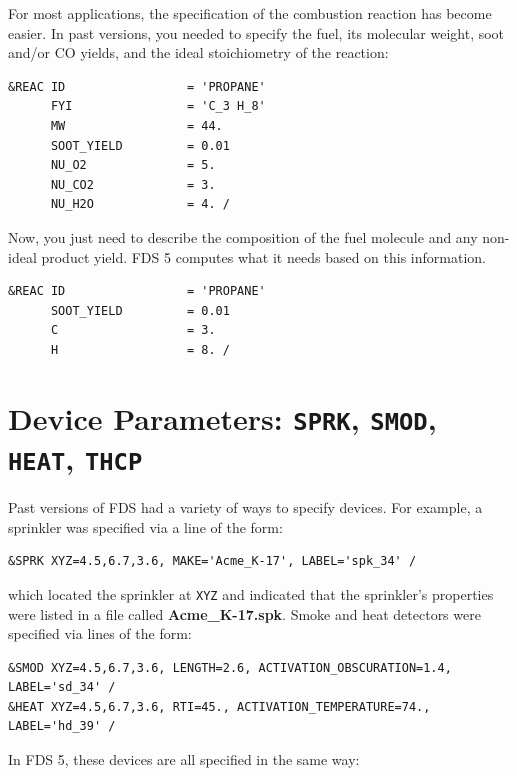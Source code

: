 \documentclass[11pt]{book}
\newcommand{\ct}{\tt\small}
\begin{document}
For most applications, the specification of the combustion reaction has become easier. In past versions,
you needed to specify the fuel, its molecular weight, soot and/or CO yields, and the ideal stoichiometry of the reaction:

\footnotesize
\begin{verbatim}
&REAC ID                 = 'PROPANE'
      FYI                = 'C_3 H_8'
      MW                 = 44.
      SOOT_YIELD         = 0.01
      NU_O2              = 5.
      NU_CO2             = 3.
      NU_H2O             = 4. /
\end{verbatim}
\normalsize

\noindent
Now, you just need to describe the composition of the fuel molecule and any non-ideal product yield. FDS 5 computes what it needs based on
this information.

\footnotesize
\begin{verbatim}
&REAC ID                 = 'PROPANE'
      SOOT_YIELD         = 0.01
      C                  = 3.
      H                  = 8. /
\end{verbatim}
\normalsize


\section{Device Parameters: \texorpdfstring{{\tt SPRK}}{SPRK}, \texorpdfstring{{\tt SMOD}}{SMOD},
\texorpdfstring{{\tt HEAT}}{HEAT}, \texorpdfstring{{\tt THCP}}{THCP}}

Past versions of FDS had a variety of ways to specify devices. For example, a sprinkler was specified via a line of the form:

\footnotesize
\begin{verbatim}
&SPRK XYZ=4.5,6.7,3.6, MAKE='Acme_K-17', LABEL='spk_34' /
\end{verbatim} \normalsize

\noindent
which located the sprinkler at {\ct XYZ} and indicated that the sprinkler's properties were listed in a file called {\bf Acme\_K-17.spk}.
Smoke and heat detectors were specified via lines of the form:

\footnotesize
\begin{verbatim}
&SMOD XYZ=4.5,6.7,3.6, LENGTH=2.6, ACTIVATION_OBSCURATION=1.4, LABEL='sd_34' /
&HEAT XYZ=4.5,6.7,3.6, RTI=45., ACTIVATION_TEMPERATURE=74., LABEL='hd_39' /
\end{verbatim} \normalsize

\noindent
In FDS 5, these devices are all specified in the same way:
\end{document}
